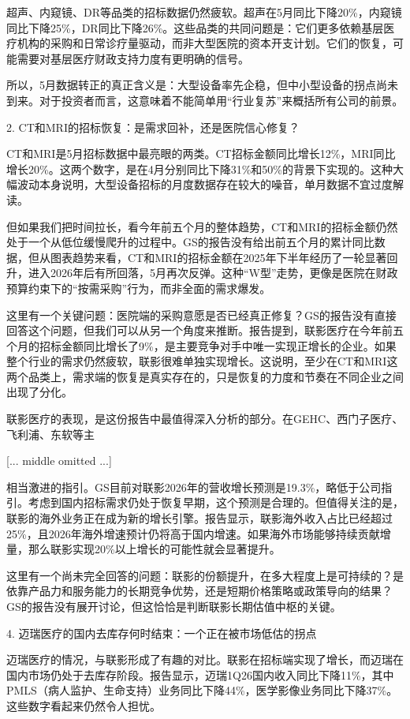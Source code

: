 \documentclass[11pt]{ctexart}
\begin{document}
超声、内窥镜、DR等品类的招标数据仍然疲软。超声在5月同比下降20\%，内窥镜同比下降25\%，DR同比下降26\%。这些品类的共同问题是：它们更多依赖基层医疗机构的采购和日常诊疗量驱动，而非大型医院的资本开支计划。它们的恢复，可能需要对基层医疗财政支持力度有更明确的信号。

所以，5月数据转正的真正含义是：大型设备率先企稳，但中小型设备的拐点尚未到来。对于投资者而言，这意味着不能简单用“行业复苏”来概括所有公司的前景。

2. CT和MRI的招标恢复：是需求回补，还是医院信心修复？

CT和MRI是5月招标数据中最亮眼的两类。CT招标金额同比增长12\%，MRI同比增长20\%。这两个数字，是在4月分别同比下降31\%和50\%的背景下实现的。这种大幅波动本身说明，大型设备招标的月度数据存在较大的噪音，单月数据不宜过度解读。

但如果我们把时间拉长，看今年前五个月的整体趋势，CT和MRI的招标金额仍然处于一个从低位缓慢爬升的过程中。GS的报告没有给出前五个月的累计同比数据，但从图表趋势来看，CT和MRI的招标金额在2025年下半年经历了一轮显著回升，进入2026年后有所回落，5月再次反弹。这种“W型”走势，更像是医院在财政预算约束下的“按需采购”行为，而非全面的需求爆发。

这里有一个关键问题：医院端的采购意愿是否已经真正修复？GS的报告没有直接回答这个问题，但我们可以从另一个角度来推断。报告提到，联影医疗在今年前五个月的招标金额同比增长了9\%，是主要竞争对手中唯一实现正增长的企业。如果整个行业的需求仍然疲软，联影很难单独实现增长。这说明，至少在CT和MRI这两个品类上，需求端的恢复是真实存在的，只是恢复的力度和节奏在不同企业之间出现了分化。

联影医疗的表现，是这份报告中最值得深入分析的部分。在GEHC、西门子医疗、飞利浦、东软等主

[... middle omitted ...]

相当激进的指引。GS目前对联影2026年的营收增长预测是19.3\%，略低于公司指引。考虑到国内招标需求仍处于恢复早期，这个预测是合理的。但值得关注的是，联影的海外业务正在成为新的增长引擎。报告显示，联影海外收入占比已经超过25\%，且2026年海外增速预计仍将高于国内增速。如果海外市场能够持续贡献增量，那么联影实现20\%以上增长的可能性就会显著提升。

这里有一个尚未完全回答的问题：联影的份额提升，在多大程度上是可持续的？是依靠产品力和服务能力的长期竞争优势，还是短期价格策略或政策导向的结果？GS的报告没有展开讨论，但这恰恰是判断联影长期估值中枢的关键。

4. 迈瑞医疗的国内去库存何时结束：一个正在被市场低估的拐点

迈瑞医疗的情况，与联影形成了有趣的对比。联影在招标端实现了增长，而迈瑞在国内市场仍处于去库存阶段。报告显示，迈瑞1Q26国内收入同比下降11\%，其中PMLS（病人监护、生命支持）业务同比下降44\%，医学影像业务同比下降37\%。这些数字看起来仍然令人担忧。
\end{document}
